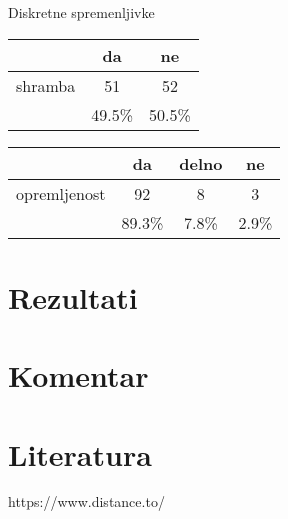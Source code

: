 \documentclass[a4paper, 11pt]{article}
\begin{document}
Diskretne spremenljivke
\begin{center}
\begin{tabular}{ c|c c }
	 & da & ne \\
	\hline
	shramba & 51 & 52 \\
	\hline
	 & 49.5\% & 50.5\% \\
\end{tabular}
\end{center}
\begin{center}
\begin{tabular}{ c|c c c }
	 & da & delno & ne \\
	\hline
	opremljenost & 92 & 8 & 3 \\
	\hline
	 & 89.3\% & 7.8\% & 2.9\% \\
\end{tabular}
\end{center}

\section{Rezultati}

\section{Komentar}

\section{Literatura}

https://www.distance.to/
\end{document}
